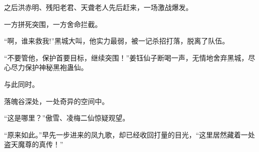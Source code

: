 \begin{this_body}
之后洪赤明、残阳老君、天聋老人先后赶来，一场激战爆发。

一方拼死突围，一方舍命拦截。

“啊，谁来救我!”黑城大叫，他实力最弱，被一记杀招打落，脱离了队伍。

“不要管他，保护首要目标，继续突围！”姜钰仙子断喝一声，无情地舍弃黑城，尽心尽力保护神秘黑袍蛊仙。

与此同时。

落魄谷深处，一处奇异的空间中。

“这是哪里？”傲雪、凌梅二仙惊疑观望。

“原来如此。”早先一步进来的凤九歌，却已经收回打量的目光，“这里居然藏着一处盗天魔尊的真传！”

\end{this_body}

